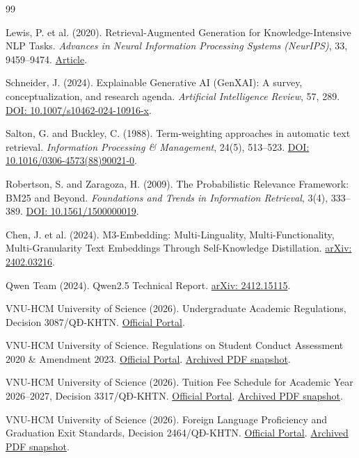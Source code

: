 \documentclass[12pt,a4paper]{article}
\begin{document}
\clearpage
\begin{thebibliography}{99}
\small

Lewis, P. et al. (2020). Retrieval-Augmented Generation for Knowledge-Intensive NLP Tasks. \emph{Advances in Neural Information Processing Systems (NeurIPS)}, 33, 9459--9474. \href{https://papers.neurips.cc/paper_files/paper/2020/hash/6b493230205f780e1bc26945df7481e5-Abstract.html}{Article}.

Schneider, J. (2024). Explainable Generative AI (GenXAI): A survey, conceptualization, and research agenda. \emph{Artificial Intelligence Review}, 57, 289. \href{https://doi.org/10.1007/s10462-024-10916-x}{DOI: 10.1007/s10462-024-10916-x}.

Salton, G. and Buckley, C. (1988). Term-weighting approaches in automatic text retrieval. \emph{Information Processing \& Management}, 24(5), 513--523. \href{https://doi.org/10.1016/0306-4573(88)90021-0}{DOI: 10.1016/0306-4573(88)90021-0}.

Robertson, S. and Zaragoza, H. (2009). The Probabilistic Relevance Framework: BM25 and Beyond. \emph{Foundations and Trends in Information Retrieval}, 3(4), 333--389. \href{https://doi.org/10.1561/1500000019}{DOI: 10.1561/1500000019}.

Chen, J. et al. (2024). M3-Embedding: Multi-Linguality, Multi-Functionality, Multi-Granularity Text Embeddings Through Self-Knowledge Distillation. \href{https://arxiv.org/abs/2402.03216}{arXiv: 2402.03216}.

Qwen Team (2024). Qwen2.5 Technical Report. \href{https://arxiv.org/abs/2412.15115}{arXiv: 2412.15115}.

VNU-HCM University of Science (2026). Undergraduate Academic Regulations, Decision 3087/QĐ-KHTN. \href{https://hcmus.edu.vn/quy-che-dao-tao-trinh-do-dai-hoc-nam-2026/}{Official Portal}.

VNU-HCM University of Science. Regulations on Student Conduct Assessment 2020 \& Amendment 2023. \href{https://hcmus.edu.vn/quy-che-danh-gia-ket-qua-ren-luyen-sinh-vien-he-chinh-quy/}{Official Portal}. \href{https://github.com/namkiet/CS420_SeminarRAG/blob/3bb5f3a/experiment/data/raw/D02_quy_che_diem_ren_luyen_2020_sua_2023.pdf}{Archived PDF snapshot}.

VNU-HCM University of Science (2026). Tuition Fee Schedule for Academic Year 2026--2027, Decision 3317/QĐ-KHTN. \href{https://hcmus.edu.vn/thong-bao-nop-hoc-phi-hoc-ky-1-2026-2027-chuong-trinh-dai-tra/}{Official Portal}. \href{https://github.com/namkiet/CS420_SeminarRAG/blob/3bb5f3a/experiment/data/raw/D03_hoc_phi_2026_2027_K2022_ve_sau.pdf}{Archived PDF snapshot}.

VNU-HCM University of Science (2026). Foreign Language Proficiency and Graduation Exit Standards, Decision 2464/QĐ-KHTN. \href{https://hcmus.edu.vn/quy-dinh-ve-viec-hoc-ngoai-ngu-va-chuan-trinh-do-ngoai-ngu-khi-tot-nghiep-dai-hoc/}{Official Portal}. \href{https://github.com/namkiet/CS420_SeminarRAG/blob/3bb5f3a/experiment/data/raw/D04_chuan_ngoai_ngu_tot_nghiep_2026.pdf}{Archived PDF snapshot}.

\end{thebibliography}
\end{document}
